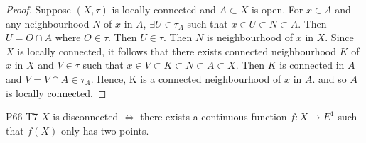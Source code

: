 
\begin{proof}
    Suppose $(X,\tau)$ is locally connected and $A\subset X$ is open. 
    For $x\in A$ and any neighbourhood $N$ of $x$ in $A$, $\exists U\in \tau_A$ such that $x\in U\subset N\subset A$.
    Then $U=O\cap A$ where $O\in \tau$. Then $U\in \tau$. Then $N$ is neighbourhood of $x$ in $X$.
    Since $X$ is locally connected, it follows that there exists connected neighbourhood $K$ of $x$ in $X$ and $V\in\tau$ such that 
    $x\in V\subset K\subset N\subset A\subset X$. 
    Then $K$ is connected in $A$ and $V=V\cap A\in\tau_A$. 
    Hence, K is a connected neighbourhood of $x$ in $A$.
    and so $A$ is locally connected.
\end{proof}

\begin{exercise}{P66 T7}{}
    $X$ is disconnected $\Leftrightarrow$ there exists a continuous function $f:X\rightarrow E^1$
    such that $f(X)$ only has two points.
\end{exercise}

